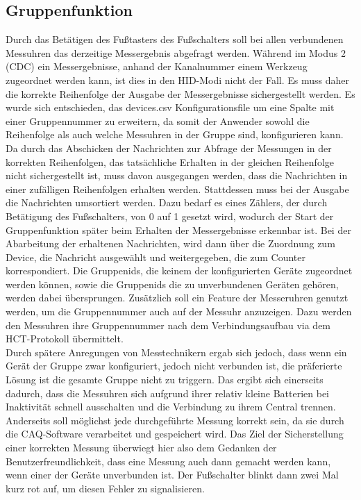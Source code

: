 \subsection{Gruppenfunktion}
Durch das Betätigen des Fußtasters des Fußschalters soll bei allen verbundenen Messuhren das derzeitige Messergebnis abgefragt werden. Während im Modus 2 (CDC) ein Messergebnisse, anhand der Kanalnummer einem Werkzeug zugeordnet werden kann, ist dies in den HID-Modi nicht der Fall. Es muss daher die korrekte Reihenfolge der Ausgabe der Messergebnisse sichergestellt werden. Es wurde sich entschieden, das devices.csv Konfigurationsfile um eine Spalte mit einer Gruppennummer zu erweitern, da somit der Anwender sowohl die Reihenfolge als auch welche Messuhren in der Gruppe sind, konfigurieren kann. Da durch das Abschicken der Nachrichten zur Abfrage der Messungen in der korrekten Reihenfolgen, das tatsächliche Erhalten in der gleichen Reihenfolge nicht sichergestellt ist, muss davon ausgegangen werden, dass die Nachrichten in einer zufälligen Reihenfolgen erhalten werden. Stattdessen muss bei der Ausgabe die Nachrichten umsortiert werden. Dazu bedarf es eines Zählers, der durch Betätigung des Fußschalters, von 0 auf 1 gesetzt wird, wodurch der Start der Gruppenfunktion später beim Erhalten der Messergebnisse erkennbar ist. Bei der Abarbeitung der erhaltenen Nachrichten, wird dann über die Zuordnung zum Device, die Nachricht ausgewählt und weitergegeben, die zum Counter korrespondiert. Die Gruppenids, die keinem der konfigurierten Geräte zugeordnet werden können, sowie die Gruppenids die zu unverbundenen Geräten gehören, werden dabei übersprungen. Zusätzlich soll ein Feature der Messeruhren genutzt werden, um die Gruppennummer auch auf der Messuhr anzuzeigen. Dazu werden den Messuhren ihre Gruppennummer nach dem Verbindungsaufbau via dem HCT-Protokoll übermittelt.\\
Durch spätere Anregungen von Messtechnikern ergab sich jedoch, dass wenn ein Gerät der Gruppe zwar konfiguriert, jedoch nicht verbunden ist, die präferierte Lösung ist die gesamte Gruppe nicht zu triggern. Das ergibt sich einerseits dadurch, dass die Messuhren sich aufgrund ihrer relativ kleine Batterien bei Inaktivität schnell ausschalten und die Verbindung zu ihrem Central trennen. Anderseits soll möglichst jede durchgeführte Messung korrekt sein, da sie durch die CAQ-Software verarbeitet und gespeichert wird. Das Ziel der Sicherstellung einer korrekten Messung überwiegt hier also dem Gedanken der Benutzerfreundlichkeit, dass eine Messung auch dann gemacht werden kann, wenn einer der Geräte unverbunden ist. Der Fußschalter blinkt dann zwei Mal kurz rot auf, um diesen Fehler zu signalisieren.\\
